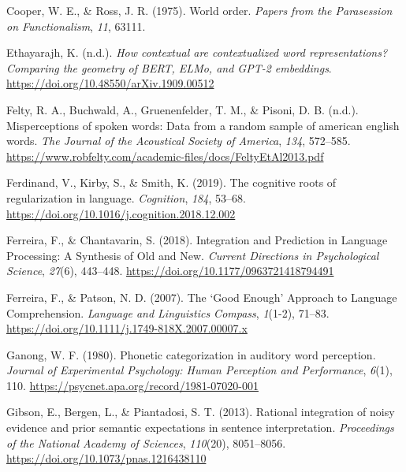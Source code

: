 \documentclass[
  12pt,
  letterpaper,
]{scrreprt}
\newlength{\cslhangindent}
\newenvironment{CSLReferences}[2] %
 {\begin{list}{}{%
  \setlength{\itemindent}{0pt}
  \setlength{\leftmargin}{0pt}
  \setlength{\parsep}{0pt}
  \ifodd #1
   \setlength{\leftmargin}{\cslhangindent}
   \setlength{\itemindent}{-1\cslhangindent}
  \fi
  \setlength{\itemsep}{#2\baselineskip}}}
 {\end{list}}
\begin{document}
\begin{CSLReferences}{1}{0}
Cooper, W. E., \& Ross, J. R. (1975). World order. \emph{Papers from the
Parasession on Functionalism}, \emph{11}, 63111.

Ethayarajh, K. (n.d.). \emph{How contextual are contextualized word
representations? Comparing the geometry of BERT, ELMo, and GPT-2
embeddings}. \url{https://doi.org/10.48550/arXiv.1909.00512}

Felty, R. A., Buchwald, A., Gruenenfelder, T. M., \& Pisoni, D. B.
(n.d.). Misperceptions of spoken words: Data from a random sample of
american english words. \emph{The Journal of the Acoustical Society of
America}, \emph{134}, 572--585.
\url{https://www.robfelty.com/academic-files/docs/FeltyEtAl2013.pdf}

Ferdinand, V., Kirby, S., \& Smith, K. (2019). The cognitive roots of
regularization in language. \emph{Cognition}, \emph{184}, 53--68.
\url{https://doi.org/10.1016/j.cognition.2018.12.002}

Ferreira, F., \& Chantavarin, S. (2018). Integration and Prediction in
Language Processing: A Synthesis of Old and New. \emph{Current
Directions in Psychological Science}, \emph{27}(6), 443--448.
\url{https://doi.org/10.1177/0963721418794491}

Ferreira, F., \& Patson, N. D. (2007). The {`}Good Enough{'} Approach to
Language Comprehension. \emph{Language and Linguistics Compass},
\emph{1}(1-2), 71--83.
\url{https://doi.org/10.1111/j.1749-818X.2007.00007.x}

Ganong, W. F. (1980). Phonetic categorization in auditory word
perception. \emph{Journal of Experimental Psychology: Human Perception
and Performance}, \emph{6}(1), 110.
\url{https://psycnet.apa.org/record/1981-07020-001}

Gibson, E., Bergen, L., \& Piantadosi, S. T. (2013). Rational
integration of noisy evidence and prior semantic expectations in
sentence interpretation. \emph{Proceedings of the National Academy of
Sciences}, \emph{110}(20), 8051--8056.
\url{https://doi.org/10.1073/pnas.1216438110}


\end{CSLReferences}
\end{document}
